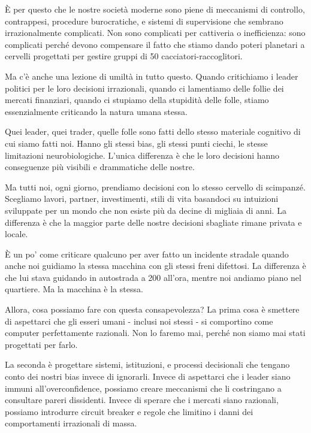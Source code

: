 È per questo che le nostre società moderne sono piene di meccanismi di controllo, contrappesi, procedure burocratiche, e sistemi di supervisione che sembrano irrazionalmente complicati. Non sono complicati per cattiveria o inefficienza: sono complicati perché devono compensare il fatto che stiamo dando poteri planetari a cervelli progettati per gestire gruppi di 50 cacciatori-raccoglitori.

\bigskip

Ma c'è anche una lezione di umiltà in tutto questo. Quando critichiamo i leader politici per le loro decisioni irrazionali, quando ci lamentiamo delle follie dei mercati finanziari, quando ci stupiamo della stupidità delle folle, stiamo essenzialmente criticando la natura umana stessa.

Quei leader, quei trader, quelle folle sono fatti dello stesso materiale cognitivo di cui siamo fatti noi. Hanno gli stessi bias, gli stessi punti ciechi, le stesse limitazioni neurobiologiche. L'unica differenza è che le loro decisioni hanno conseguenze più visibili e drammatiche delle nostre.

Ma tutti noi, ogni giorno, prendiamo decisioni con lo stesso cervello di scimpanzé. Scegliamo lavori, partner, investimenti, stili di vita basandoci su intuizioni sviluppate per un mondo che non esiste più da decine di migliaia di anni. La differenza è che la maggior parte delle nostre decisioni sbagliate rimane privata e locale.

È un po' come criticare qualcuno per aver fatto un incidente stradale quando anche noi guidiamo la stessa macchina con gli stessi freni difettosi. La differenza è che lui stava guidando in autostrada a 200 all'ora, mentre noi andiamo piano nel quartiere. Ma la macchina è la stessa.

\bigskip

Allora, cosa possiamo fare con questa consapevolezza? La prima cosa è smettere di aspettarci che gli esseri umani - inclusi noi stessi - si comportino come computer perfettamente razionali. Non lo faremo mai, perché non siamo mai stati progettati per farlo.

La seconda è progettare sistemi, istituzioni, e processi decisionali che tengano conto dei nostri bias invece di ignorarli. Invece di aspettarci che i leader siano immuni all'overconfidence, possiamo creare meccanismi che li costringano a consultare pareri dissidenti. Invece di sperare che i mercati siano razionali, possiamo introdurre circuit breaker e regole che limitino i danni dei comportamenti irrazionali di massa.

